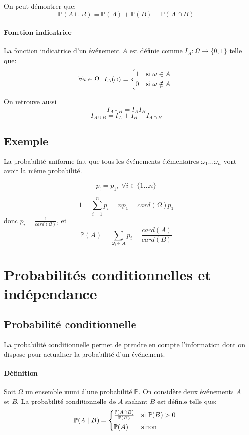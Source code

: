 \documentclass[a4paper,10pt,french]{memoir}
\newcommand{\Proba}{\mathbb{P}}
\newcommand{\inter}{\cap}
\newcommand{\union}{\cup}
\newcommand{\sachant}{\mid}
\begin{document}
On peut démontrer que:
\[ \Proba(A \union B) = \Proba(A) + \Proba(B) - \Proba(A \inter B) \]

\paragraph{Fonction indicatrice} La fonction indicatrice d'un événement $A$ est définie comme
$ I_A: \Omega \rightarrow \lbrace 0, 1 \rbrace $
telle que:
\[
\forall u \in \Omega, \; I_A(\omega) = \begin{cases*}
1 & si $\omega \in A$ \\ 
0 & si $\omega \notin A$
\end{cases*}
\]

On retrouve aussi
\[I_{A \inter B} = I_A I_B\]
\[I_{A \union B} = I_A + I_B - I_{A \inter B}\]

\subsection{Exemple}

La probabilité uniforme fait que tous les événements élémentaires $\omega_1\dots\omega_n$ vont avoir la même probabilité.

\[ p_i = p_1, \; \forall i \in \lbrace 1 \dots n \rbrace \]

\[ 1 = \sum_{i=1}^n p_i = n p_1 = card(\Omega) p_1 \]
donc $p_i = \frac{1}{card(\Omega)}$, et
\[ \Proba(A) = \sum_{\omega_i \in A} p_i = \frac{card(A)}{card(B)} \]

\section{Probabilités conditionnelles et indépendance}
\subsection{Probabilité conditionnelle}

La probabilité conditionnelle permet de prendre en compte l'information dont on dispose pour actualiser la probabilité d'un événement.

\paragraph{Définition}
Soit $\Omega$ un ensemble muni d'une probabilité $\Proba$. On considère deux événements $A$ et $B$. La probabilité conditionnelle de $A$ sachant $B$ est définie telle que:
\[
\Proba(A \sachant B) =
    \begin{cases*}
        \frac{\Proba(A \inter B)}{\Proba(B)} & si $\Proba(B) > 0$ \\
        \Proba(A) & sinon
    \end{cases*}
\]
\end{document}
